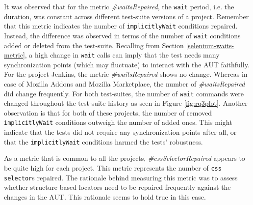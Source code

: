 It was observed that for the metric \textit{\#waitsRepaired}, the \texttt{wait} period, i.e. the duration, was constant across different test-suite versions of a project. Remember that this metric indicates the number of \texttt{implicitlyWait} conditions repaired. Instead, the difference was observed in terms of the number of \texttt{wait} conditions added or deleted from the test-suite.  
Recalling from Section \ref{selenium-waits-metric}, a high change in \texttt{wait} calls can imply that the test needs many synchronization points (which may fluctuate) to interact with the AUT faithfully. 
For the project Jenkins, the metric \textit{\#waitsRepaired} shows no change. Whereas in case of Mozilla Addons and Mozilla Marketplace, the number of \textit{\#waitsRepaired} did change frequently. For both test-suites, the number of \texttt{wait} commands were changed throughout the test-suite history as seen in Figure \ref{fig:rq3plot}. Another observation is that for both of these projects, the number of removed \texttt{implicitlyWait} conditions outweigh the number of added ones. This might indicate that the tests did not require any synchronization points after all, or that the \texttt{implicitlyWait} conditions harmed the tests' robustness. 

As a metric that is common to all the projects, \textit{\#cssSelectorRepaired} appears to be quite high for each project. This metric represents the number of \texttt{css selector}s repaired. The rationale behind measuring this metric was to assess whether structure based locators need to be repaired frequently against the changes in the AUT. This rationale seems to hold true in this case. 



